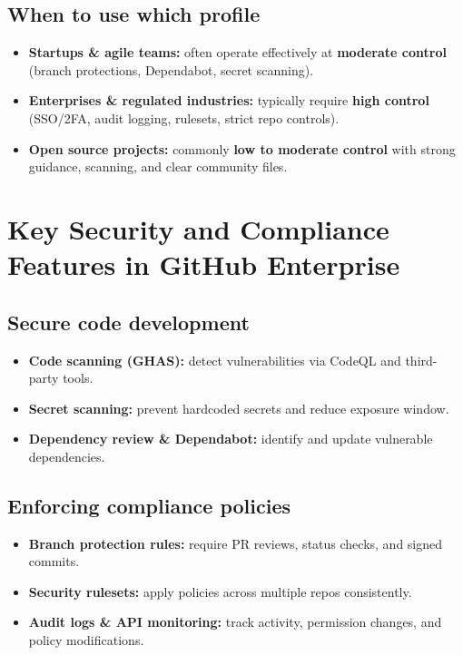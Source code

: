 \documentclass[11pt]{article}
\begin{document}
\subsection{When to use which profile}
\begin{itemize}[leftmargin=*,itemsep=2pt]
  \item \textbf{Startups \& agile teams:} often operate effectively at \textbf{moderate control} (branch protections, Dependabot, secret scanning).
  \item \textbf{Enterprises \& regulated industries:} typically require \textbf{high control} (SSO/2FA, audit logging, rulesets, strict repo controls).
  \item \textbf{Open source projects:} commonly \textbf{low to moderate control} with strong guidance, scanning, and clear community files.
\end{itemize}

\section{Key Security and Compliance Features in GitHub Enterprise}

\subsection{Secure code development}
\begin{itemize}[leftmargin=*,itemsep=2pt]
  \item \textbf{Code scanning (GHAS):} detect vulnerabilities via CodeQL and third-party tools.
  \item \textbf{Secret scanning:} prevent hardcoded secrets and reduce exposure window.
  \item \textbf{Dependency review \& Dependabot:} identify and update vulnerable dependencies.
\end{itemize}

\subsection{Enforcing compliance policies}
\begin{itemize}[leftmargin=*,itemsep=2pt]
  \item \textbf{Branch protection rules:} require PR reviews, status checks, and signed commits.
  \item \textbf{Security rulesets:} apply policies across multiple repos consistently.
  \item \textbf{Audit logs \& API monitoring:} track activity, permission changes, and policy modifications.
\end{itemize}
\end{document}

